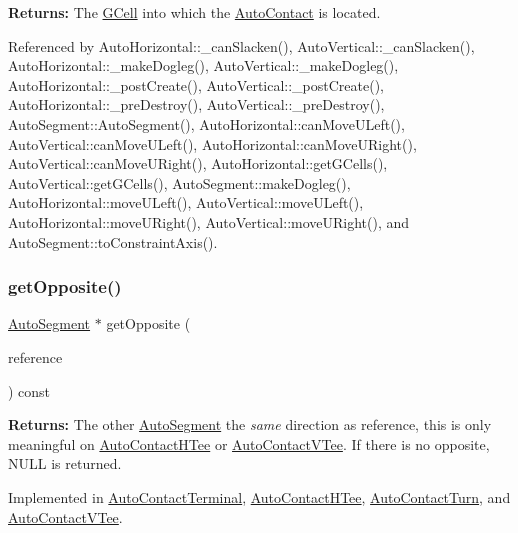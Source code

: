 {\bfseries Returns\+:} The \hyperlink{classKatabatic_1_1GCell}{G\+Cell} into which the \hyperlink{classKatabatic_1_1AutoContact}{Auto\+Contact} is located. 

Referenced by Auto\+Horizontal\+::\+\_\+can\+Slacken(), Auto\+Vertical\+::\+\_\+can\+Slacken(), Auto\+Horizontal\+::\+\_\+make\+Dogleg(), Auto\+Vertical\+::\+\_\+make\+Dogleg(), Auto\+Horizontal\+::\+\_\+post\+Create(), Auto\+Vertical\+::\+\_\+post\+Create(), Auto\+Horizontal\+::\+\_\+pre\+Destroy(), Auto\+Vertical\+::\+\_\+pre\+Destroy(), Auto\+Segment\+::\+Auto\+Segment(), Auto\+Horizontal\+::can\+Move\+U\+Left(), Auto\+Vertical\+::can\+Move\+U\+Left(), Auto\+Horizontal\+::can\+Move\+U\+Right(), Auto\+Vertical\+::can\+Move\+U\+Right(), Auto\+Horizontal\+::get\+G\+Cells(), Auto\+Vertical\+::get\+G\+Cells(), Auto\+Segment\+::make\+Dogleg(), Auto\+Horizontal\+::move\+U\+Left(), Auto\+Vertical\+::move\+U\+Left(), Auto\+Horizontal\+::move\+U\+Right(), Auto\+Vertical\+::move\+U\+Right(), and Auto\+Segment\+::to\+Constraint\+Axis().

\mbox{\label{classKatabatic_1_1AutoContact_a48ab1d3bdf85712e4784ef83ef136939}} 
\subsubsection{\texorpdfstring{get\+Opposite()}{getOpposite()}}
{\footnotesize\ttfamily \hyperlink{classKatabatic_1_1AutoSegment}{Auto\+Segment} $\ast$ get\+Opposite (\begin{DoxyParamCaption}\item[{const \hyperlink{classKatabatic_1_1AutoSegment}{Auto\+Segment} $\ast$}]{reference }\end{DoxyParamCaption}) const\hspace{0.3cm}{\ttfamily [pure virtual]}}

{\bfseries Returns\+:} The other \hyperlink{classKatabatic_1_1AutoSegment}{Auto\+Segment} the {\itshape same} direction as {\ttfamily reference}, this is only meaningful on \hyperlink{classKatabatic_1_1AutoContactHTee}{Auto\+Contact\+H\+Tee} or \hyperlink{classKatabatic_1_1AutoContactVTee}{Auto\+Contact\+V\+Tee}. If there is no opposite, {\ttfamily N\+U\+LL} is returned. 

Implemented in \hyperlink{classKatabatic_1_1AutoContactTerminal_ac9c9b04e245a1109e297510a3968b7ac}{Auto\+Contact\+Terminal}, \hyperlink{classKatabatic_1_1AutoContactHTee_ac9c9b04e245a1109e297510a3968b7ac}{Auto\+Contact\+H\+Tee}, \hyperlink{classKatabatic_1_1AutoContactTurn_ac9c9b04e245a1109e297510a3968b7ac}{Auto\+Contact\+Turn}, and \hyperlink{classKatabatic_1_1AutoContactVTee_ac9c9b04e245a1109e297510a3968b7ac}{Auto\+Contact\+V\+Tee}.

